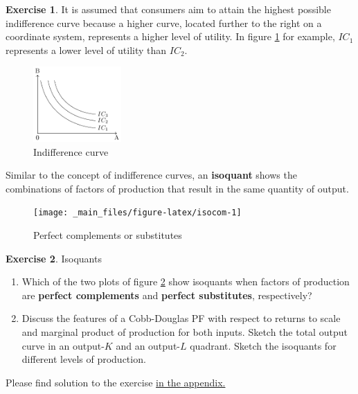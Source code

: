 \documentclass[
  12pt,
  oneside]{book}
\theoremstyle{definition}
\theoremstyle{definition}
\theoremstyle{definition}
\newtheorem{exercise}{Exercise}[chapter]
\theoremstyle{definition}
\theoremstyle{remark}
\begin{document}
\begin{exercise}
It is assumed that consumers aim to attain the highest possible indifference curve because a higher curve, located further to the right on a coordinate system, represents a higher level of utility. In figure \ref{fig:ic2} for example, \(IC_1\) represents a lower level of utility than \(IC_2\).

\begin{figure}
\centering
\includegraphics[width=0.3\textwidth,height=\textheight]{fig/ic2.png}
\caption{\label{fig:ic2} Indifference curve}
\end{figure}

Similar to the concept of indifference curves, an \textbf{isoquant} shows the combinations of factors of production that result in the same quantity of output.
\end{exercise}

\begin{figure}

{\centering \texttt{[image: \_main\_files/figure-latex/isocom-1]} 

}

\caption{Perfect complements or substitutes}\label{fig:isocom}
\end{figure}

\begin{exercise}
\protect\hypertarget{exr:isoquants}{}\label{exr:isoquants}Isoquants

\begin{enumerate}
\def\labelenumi{\alph{enumi})}
\item
  Which of the two plots of figure \ref{fig:isocom} show isoquants when factors of production are \textbf{perfect complements} and \textbf{perfect substitutes}, respectively?
\item
  Discuss the features of a Cobb-Douglas PF with respect to returns to scale and marginal product of production for both inputs. Sketch the total output curve in an output-\(K\) and an output-\(L\) quadrant. Sketch the isoquants for different levels of production.
\end{enumerate}

Please find solution to the exercise \protect\hyperlink{sol:isoquants}{in the appendix.}
\end{exercise}
\end{document}
